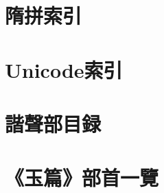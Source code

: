 \documentclass[a5paper,10pt,twoside]{article}
\begin{document}
\part{隋拼索引}

\part{Unicode索引}\label{part:Unicode索引}

\part{諧聲部目録}\label{part:諧聲部目録}

\part{《玉篇》部首一覽}\label{part:玉篇部首一覽}

\end{document}
